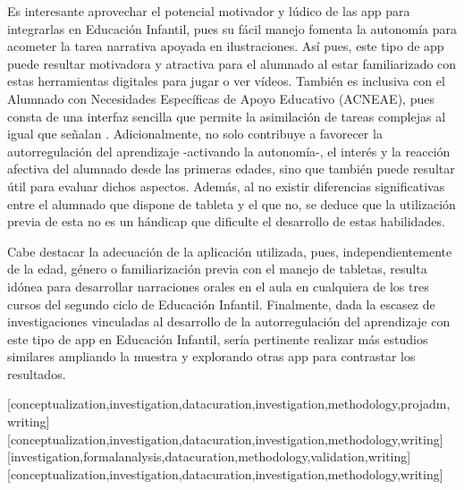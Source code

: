 \documentclass[spanish]{textolivre}
\begin{document}
Es interesante aprovechar el potencial motivador y lúdico de las app para integrarlas en Educación Infantil, pues su fácil manejo fomenta la autonomía para acometer la tarea narrativa apoyada en ilustraciones. Así pues, este tipo de app puede resultar motivadora y atractiva para el alumnado al estar familiarizado con estas herramientas digitales para jugar o ver vídeos. También es inclusiva con el Alumnado con Necesidades Específicas de Apoyo Educativo (ACNEAE), pues consta de una interfaz sencilla que permite la asimilación de tareas complejas al igual que señalan \textcite{jimenez_utilizacion_2017}. Adicionalmente, no solo contribuye a favorecer la autorregulación del aprendizaje -activando la autonomía-, el interés y la reacción afectiva del alumnado desde las primeras edades, sino que también puede resultar útil para evaluar dichos aspectos. Además, al no existir diferencias significativas entre el alumnado que dispone de tableta y el que no, se deduce que la utilización previa de esta no es un hándicap que dificulte el desarrollo de estas habilidades.

Cabe destacar la adecuación de la aplicación utilizada, pues, independientemente de la edad, género o familiarización previa con el manejo de tabletas, resulta idónea para desarrollar narraciones orales en el aula en cualquiera de los tres cursos del segundo ciclo de Educación Infantil. Finalmente, dada la escasez de investigaciones vinculadas al desarrollo de la autorregulación del aprendizaje con este tipo de app en Educación Infantil, sería pertinente realizar más estudios similares ampliando la muestra y explorando otras app para contrastar los resultados.


\printbibliography\label{sec-bib}


\begin{contributors}
[conceptualization,investigation,datacuration,investigation,methodology,projadm,writing]
[conceptualization,investigation,datacuration,investigation,methodology,writing]
[investigation,formalanalysis,datacuration,methodology,validation,writing]
[conceptualization,investigation,datacuration,investigation,methodology,writing]
\end{contributors}
\end{document}
